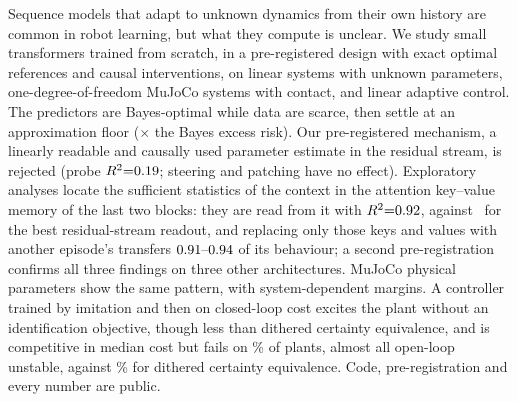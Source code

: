 Sequence models that adapt to unknown dynamics from their own history are common in robot learning, but what they
compute is unclear. We study small transformers trained from scratch, in a pre-registered design with exact optimal
references and causal interventions, on linear systems with unknown parameters, one-degree-of-freedom MuJoCo systems
with contact, and linear adaptive control. The predictors
are Bayes-optimal while data are scarce, then settle at an approximation floor (\Aratio$\times$ the Bayes excess risk).
Our pre-registered mechanism, a linearly readable and causally used parameter estimate in the residual stream, is
rejected (probe $R^2{=}0.19$; steering and patching have no effect). Exploratory analyses locate the sufficient
statistics of the context in the attention key--value memory of the last two blocks: they are read from it with
$R^2{=}0.92$, against \AcResBestMom\ for the best residual-stream readout, and replacing only those keys and values
with another episode's transfers $0.91\mbox{--}0.94$ of its behaviour; a second pre-registration confirms all three findings on
three other architectures. MuJoCo physical parameters show the same pattern, with system-dependent margins. A
controller trained by imitation and then on closed-loop cost excites the plant without an identification objective,
though less than dithered certainty equivalence, and is competitive in median cost but fails on \CTFfail\% of plants,
almost all open-loop unstable, against \CCEDfail\% for dithered certainty equivalence. Code, pre-registration and every number are public.
